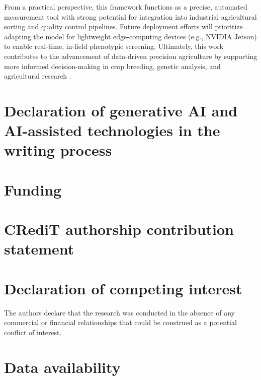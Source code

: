 \documentclass[final,5p,times,twocolumn]{elsarticle}
\begin{document}
From a practical perspective, this framework functions as a precise, automated measurement tool with strong potential for integration into industrial agricultural sorting and quality control pipelines. Future deployment efforts will prioritize adapting the model for lightweight edge-computing devices (e.g., NVIDIA Jetson) to enable real-time, in-field phenotypic screening. Ultimately, this work contributes to the advancement of data-driven precision agriculture by supporting more informed decision-making in crop breeding, genetic analysis, and agricultural research \cite{next}.


\section*{Declaration of generative AI and AI-assisted technologies in the writing process}

\section*{Funding}

\section*{CRediT authorship contribution statement}

\section*{Declaration of competing interest}
The authors declare that the research was conducted in the absence of any commercial or financial relationships that could be construed as a potential conflict of interest.

\section*{Data availability}






\end{document}
